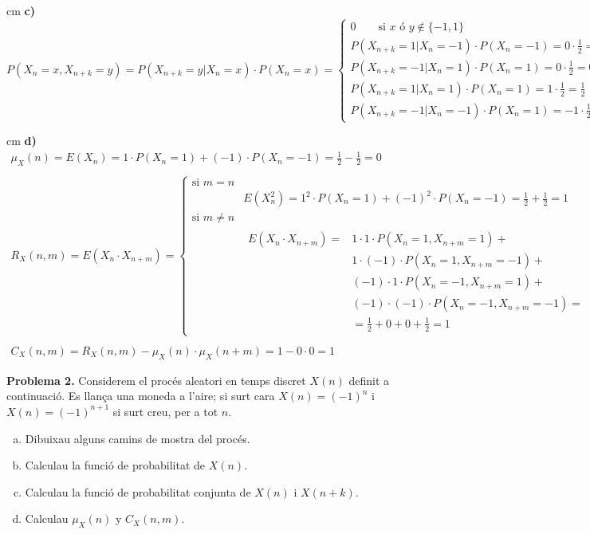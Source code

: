 \documentclass{article}
\begin{document}
 cm
\noindent
\textbf{c)}
\[
P(X_n=x, X_{n+k}=y)=P(X_{n+k}=y | X_n=x) \cdot P(X_n=x)=\begin{cases}
0 \qquad \text{si } x \text{ \'o } y \notin \{ -1, 1 \} & \\
P(X_{n+k}=1 | X_n=-1) \cdot P(X_n=-1)= 0 \cdot \frac{1}{2}=0 & \\
P(X_{n+k}=-1 | X_n=1) \cdot P(X_n=1)= 0 \cdot \frac{1}{2}=0 & \\
P(X_{n+k}=1 | X_n=1) \cdot P(X_n=1)= 1 \cdot \frac{1}{2}=\frac{1}{2} & \\
P(X_{n+k}=-1 | X_n=-1) \cdot P(X_n=1)= -1 \cdot \frac{1}{2}=\frac{1}{2} 
\end{cases}
\]

 cm
\noindent
\textbf{d)}
\[
\begin{array}{l}
\mu_X(n)=E(X_n)=1 \cdot P(X_n=1) + (-1) \cdot P(X_n=-1) = \frac{1}{2} - \frac{1}{2}=0 \\ \\
R_X(n, m)=E(X_n \cdot X_{n+m})=
\begin{cases} 
\text{si } m=n & \\
& E(X_n^2)=1^2 \cdot P(X_n=1)+(-1)^2 \cdot P(X_n=-1)=\frac{1}{2} + \frac{1}{2}=1 \\
\text{si } m \neq n & \\ 
&
\begin{array}{ll}
E(X_n \cdot X_{n+m})= & 1 \cdot 1 \cdot P(X_n=1, X_{n+m}=1) + \\
                      & 1 \cdot (-1) \cdot P(X_n=1, X_{n+m}=-1)+ \\
                      &  (-1) \cdot 1 \cdot P(X_n=-1, X_{n+m}=1) + \\
                      & (-1) \cdot (-1) \cdot P(X_n=-1, X_{n+m}=-1)= \\
                      & = \frac{1}{2} + 0 + 0+ \frac{1}{2}=1
\end{array}
\end{cases}
\\ \\
C_X(n, m)=R_X(n, m)-\mu_X(n) \cdot \mu_X(n+m)=1 - 0 \cdot 0 = 1
\end{array}
\]

\newpage

\noindent
\textbf{Problema 2.}
Considerem el proc\'es aleatori en temps  discret $X(n)$
definit a continuaci\'o. Es llan\c{c}a una moneda a l'aire;  si surt
cara $X(n)=(-1)^n$ i $X(n)=(-1)^{n+1}$ si surt creu, per a tot $n$.

\begin{enumerate}[a)]
\item Dibuixau alguns camins de mostra del proc\'es.
\item Calculau la funci\'o de probabilitat de $X(n)$.
\item Calculau la funci\'o de probabilitat conjunta  de $X(n)$ i
$X(n+k)$.
\item Calculau $\mu_{X}(n)$ y $C_{X}(n,m)$.
\end{enumerate}
\end{document}
